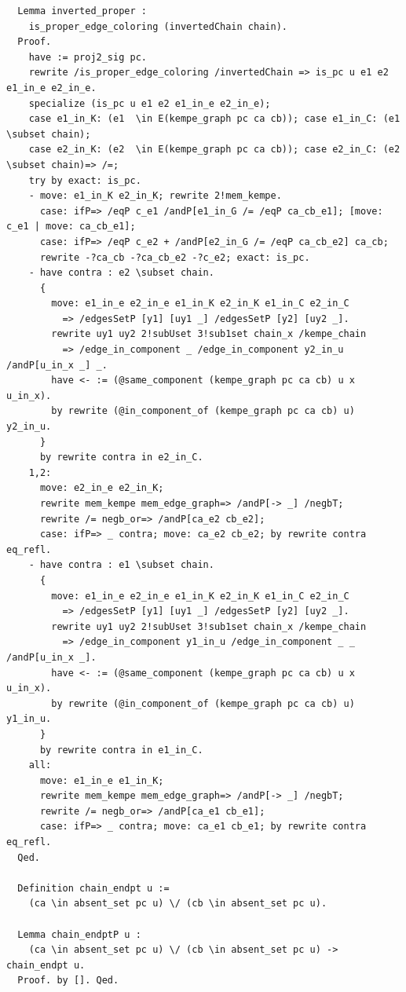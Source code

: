 \begin{verbatim}
  Lemma inverted_proper : 
    is_proper_edge_coloring (invertedChain chain).
  Proof.
    have := proj2_sig pc.
    rewrite /is_proper_edge_coloring /invertedChain => is_pc u e1 e2 e1_in_e e2_in_e.
    specialize (is_pc u e1 e2 e1_in_e e2_in_e);
    case e1_in_K: (e1  \in E(kempe_graph pc ca cb)); case e1_in_C: (e1 \subset chain);
    case e2_in_K: (e2  \in E(kempe_graph pc ca cb)); case e2_in_C: (e2 \subset chain)=> /=;
    try by exact: is_pc.
    - move: e1_in_K e2_in_K; rewrite 2!mem_kempe.
      case: ifP=> /eqP c_e1 /andP[e1_in_G /= /eqP ca_cb_e1]; [move: c_e1 | move: ca_cb_e1];
      case: ifP=> /eqP c_e2 + /andP[e2_in_G /= /eqP ca_cb_e2] ca_cb;
      rewrite -?ca_cb -?ca_cb_e2 -?c_e2; exact: is_pc.
    - have contra : e2 \subset chain.
      {
        move: e1_in_e e2_in_e e1_in_K e2_in_K e1_in_C e2_in_C
          => /edgesSetP [y1] [uy1 _] /edgesSetP [y2] [uy2 _].
        rewrite uy1 uy2 2!subUset 3!sub1set chain_x /kempe_chain
          => /edge_in_component _ /edge_in_component y2_in_u /andP[u_in_x _] _.
        have <- := (@same_component (kempe_graph pc ca cb) u x u_in_x).
        by rewrite (@in_component_of (kempe_graph pc ca cb) u) y2_in_u.
      }
      by rewrite contra in e2_in_C.
    1,2: 
      move: e2_in_e e2_in_K;
      rewrite mem_kempe mem_edge_graph=> /andP[-> _] /negbT;
      rewrite /= negb_or=> /andP[ca_e2 cb_e2];
      case: ifP=> _ contra; move: ca_e2 cb_e2; by rewrite contra eq_refl.
    - have contra : e1 \subset chain.
      {
        move: e1_in_e e2_in_e e1_in_K e2_in_K e1_in_C e2_in_C
          => /edgesSetP [y1] [uy1 _] /edgesSetP [y2] [uy2 _].
        rewrite uy1 uy2 2!subUset 3!sub1set chain_x /kempe_chain
          => /edge_in_component y1_in_u /edge_in_component _ _ /andP[u_in_x _].
        have <- := (@same_component (kempe_graph pc ca cb) u x u_in_x).
        by rewrite (@in_component_of (kempe_graph pc ca cb) u) y1_in_u.
      }
      by rewrite contra in e1_in_C.
    all:
      move: e1_in_e e1_in_K;
      rewrite mem_kempe mem_edge_graph=> /andP[-> _] /negbT;
      rewrite /= negb_or=> /andP[ca_e1 cb_e1];
      case: ifP=> _ contra; move: ca_e1 cb_e1; by rewrite contra eq_refl.
  Qed.

  Definition chain_endpt u :=
    (ca \in absent_set pc u) \/ (cb \in absent_set pc u).

  Lemma chain_endptP u :
    (ca \in absent_set pc u) \/ (cb \in absent_set pc u) -> chain_endpt u.
  Proof. by []. Qed.


\end{verbatim}
